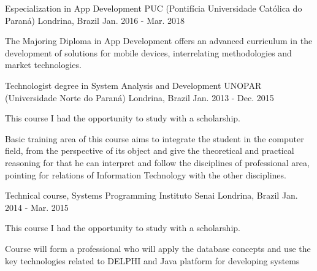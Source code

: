 

\begin{cventries}

  \cventry
    {Especialization in App Development} %
    {PUC (Pontifícia Universidade Católica do Paraná)} %
    {Londrina, Brazil} %
    {Jan. 2016 - Mar. 2018} %
    {
      \begin{cvitems} %
\item {The Majoring Diploma in App Development offers an advanced curriculum in the development of solutions for mobile devices, interrelating methodologies and market technologies.}
      \end{cvitems}
    }



  \cventry
    { Technologist degree in System Analysis and Development} %
    {UNOPAR (Universidade Norte do Paraná)} %
    {Londrina, Brazil} %
    {Jan. 2013 - Dec. 2015} %
    {
      \begin{cvitems} %
        \item {This course I had the opportunity to study with a scholarship.}
\item {Basic training area of this course aims to integrate the student in the computer field, from the perspective of its object and give the theoretical and practical reasoning for that he can interpret and follow the disciplines of professional area, pointing for relations of Information Technology with the other disciplines.}
      \end{cvitems}
    }
    
  \cventry
    {Technical course, Systems Programming} %
    {Instituto Senai} %
    {Londrina, Brazil} %
    {Jan. 2014 - Mar. 2015} %
    {
      \begin{cvitems} %
        \item {This course I had the opportunity to study with a scholarship.}
\item {Course will form a professional who will apply the database concepts and use the key technologies related to DELPHI and Java platform for developing systems}
      \end{cvitems}
    }
\end{cventries}
